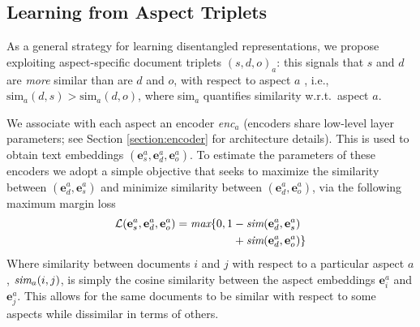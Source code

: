 \documentclass[11pt,a4paper]{article}
\begin{document}
\vspace{-.25em}
\subsection{Learning from Aspect Triplets}

As a general strategy for learning disentangled representations, we propose exploiting aspect-specific document triplets $(s,d,o)_a$: this signals that $s$ and $d$ are \emph{more} similar than are $d$ and $o$, with respect to aspect $a$ \cite{karaletsos2015bayesian,veit2016conditional}, i.e., $\text{sim}_a (d, s) > \text{sim}_a (d, o)$, where sim$_a$ quantifies similarity w.r.t.~aspect $a$. 



We associate with each aspect an encoder \emph{enc}$_a$ (encoders share low-level layer parameters; see Section \ref{section:encoder} for architecture details). This is used to obtain text embeddings $(\mathbf{e}^a_s, \mathbf{e}^a_d, \mathbf{e}^a_o)$. To estimate the parameters of these encoders we adopt a simple objective that seeks to maximize the similarity between $(\mathbf{e}^a_d, \mathbf{e}^a_s)$ and minimize similarity between $(\mathbf{e}^a_d, \mathbf{e}^a_o)$, via the following maximum margin loss%
\vspace{-.2em}
\begin{equation}
\begin{aligned}
\mathcal{L}(\mathbf{e}^a_s, \mathbf{e}^a_d, \mathbf{e}^a_o) = \text{\it max}\{0,  1 &- \text{\it sim}(\mathbf{e}^a_d, \mathbf{e}^a_s) \\&+ \text{\it sim}(\mathbf{e}^a_d, \mathbf{e}^a_o)\}
\end{aligned}
\end{equation}
\noindent Where similarity between documents $i$ and $j$ with respect to a particular aspect $a$,  $\text{\it sim}_a(i, j)$, is simply the cosine similarity between the aspect embeddings $\mathbf{e}^a_i$ and $\mathbf{e}^a_j$. This allows for the same documents to be similar with respect to some aspects while dissimilar in terms of others.
\end{document}
